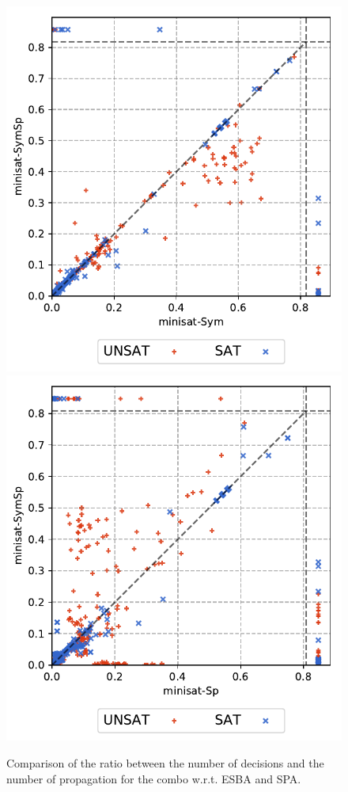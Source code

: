 \begin{center}
\begin{figure}[!htbp]
 \centering
 \includegraphics[scale=0.6]{img/full-INFGB-ratio-vscosy.pdf}%
 \includegraphics[scale=0.6]{img/full-INFGB-ratio-vsspfs.pdf}%
 \caption{Comparison of the ratio between the number of decisions and the number of propagation for the combo w.r.t. ESBA and SPA.}
 \label{fig:ratio}
\end{figure}
\end{center}
